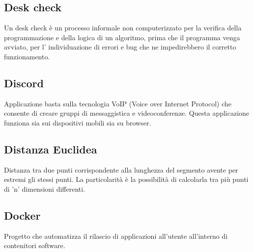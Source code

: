 \subsection*{Desk check}
Un desk check è un processo informale non computerizzato per la verifica della programmazione e della logica di un algoritmo, prima che il programma venga avviato, per l' individuazione di errori e bug che ne impedirebbero il corretto funzionamento.

\subsection*{Discord}
Applicazione  basta sulla tecnologia VoIP (Voice over Internet Protocol) che consente di creare gruppi di messaggistica e videoconferenze. Questa applicazione funziona sia sui dispositivi mobili sia su browser.

\subsection*{Distanza Euclidea}
Distanza tra due punti corrispondente alla lunghezza del segmento avente per estremi gli stessi punti. La particolarità è la possibilità di calcolarla tra più punti di 'n' dimensioni differenti.

\subsection*{Docker}
Progetto  che automatizza il rilascio di applicazioni all'utente all'interno di contenitori software.



